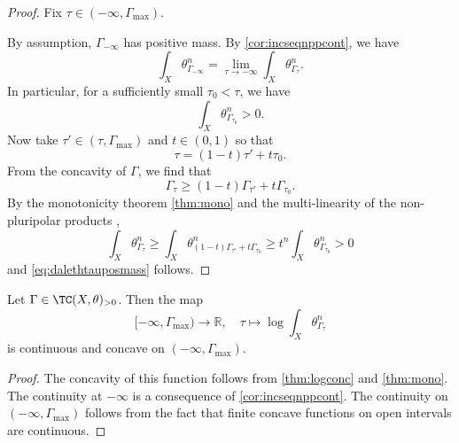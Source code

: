 \begin{proof}

    Fix $\tau\in (-\infty,\Gamma_{\max})$.

    By assumption, $\Gamma_{-\infty}$ has positive mass. By \cref{cor:incseqnppcont}, we have
    \[
    \int_X \theta_{\Gamma_{-\infty}}^n=\lim_{\tau\to -\infty}\int_X \theta_{\Gamma_{\tau}}^n.
    \]
    In particular, for a sufficiently small $\tau_0<\tau$, we have
    \[
    \int_X \theta_{\Gamma_{\tau_0}}^n>0.
    \]
    Now take $\tau'\in (\tau, \Gamma_{\max})$ and $t\in (0,1)$ so that
    \[
    \tau=(1-t)\tau'+t\tau_0.
    \]
    From the concavity of $\Gamma$, we find that
    \[
    \Gamma_{\tau}\geq (1-t)\Gamma_{\tau'}+t\Gamma_{\tau_0}.
    \]
    By the monotonicity theorem \cref{thm:mono} and the multi-linearity of the non-pluripolar products ,
    \[
    \int_X \theta_{\Gamma_{\tau}}^n\geq \int_X \theta_{(1-t)\Gamma_{\tau'}+t\Gamma_{\tau_0}}^n\geq t^n \int_X \theta_{\Gamma_{\tau_0}}^n>0
    \]
    and \eqref{eq:dalethtauposmass} follows.
\end{proof}

\begin{proposition}\label{prop:testcurvmasslogconc}
    Let $\Gamma\in \TC(X,\theta)_{>0}$. Then the map
    \[
    [-\infty,\Gamma_{\max})\rightarrow \mathbb{R},\quad \tau\mapsto \log \int_X \theta_{\Gamma_{\tau}}^n
    \]
    is continuous and concave on $(-\infty,\Gamma_{\max})$.
\end{proposition}
\begin{proof}
    The concavity of this function follows from \cref{thm:logconc} and \cref{thm:mono}. The continuity at $-\infty$ is a consequence of \cref{cor:incseqnppcont}.
    The continuity on $(-\infty,\Gamma_{\max})$ follows from the fact that finite concave functions on open intervals are continuous.
\end{proof}

